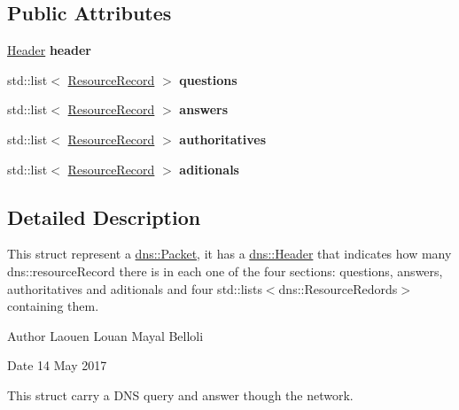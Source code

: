 \subsection*{Public Attributes}
\begin{DoxyCompactItemize}
\item 
\hyperlink{structdns_1_1Header}{Header} {\bfseries header}\hypertarget{structdns_1_1Packet_ace5e0371bc023efa2b4cd9ba82489052}{}\label{structdns_1_1Packet_ace5e0371bc023efa2b4cd9ba82489052}

\item 
std\+::list$<$ \hyperlink{structdns_1_1ResourceRecord}{Resource\+Record} $>$ {\bfseries questions}\hypertarget{structdns_1_1Packet_a5631816949452064bfef6add1307a84a}{}\label{structdns_1_1Packet_a5631816949452064bfef6add1307a84a}

\item 
std\+::list$<$ \hyperlink{structdns_1_1ResourceRecord}{Resource\+Record} $>$ {\bfseries answers}\hypertarget{structdns_1_1Packet_aacd3022640b60706f6be45c497a5ca15}{}\label{structdns_1_1Packet_aacd3022640b60706f6be45c497a5ca15}

\item 
std\+::list$<$ \hyperlink{structdns_1_1ResourceRecord}{Resource\+Record} $>$ {\bfseries authoritatives}\hypertarget{structdns_1_1Packet_a07495fe7b4c452b136da01b155c2f608}{}\label{structdns_1_1Packet_a07495fe7b4c452b136da01b155c2f608}

\item 
std\+::list$<$ \hyperlink{structdns_1_1ResourceRecord}{Resource\+Record} $>$ {\bfseries aditionals}\hypertarget{structdns_1_1Packet_aafa573148fd6ea9451c6f7db16676f25}{}\label{structdns_1_1Packet_aafa573148fd6ea9451c6f7db16676f25}

\end{DoxyCompactItemize}


\subsection{Detailed Description}
This struct represent a \hyperlink{structdns_1_1Packet}{dns\+::\+Packet}, it has a \hyperlink{structdns_1_1Header}{dns\+::\+Header} that indicates how many dns\+::resource\+Record there is in each one of the four sections\+: questions, answers, authoritatives and aditionals and four std\+::lists$<$dns\+::\+Resource\+Redords$>$ containing them. 

\begin{DoxyAuthor}{Author}
Laouen Louan Mayal Belloli 
\end{DoxyAuthor}
\begin{DoxyDate}{Date}
14 May 2017
\end{DoxyDate}
This struct carry a D\+NS query and answer though the network. 

